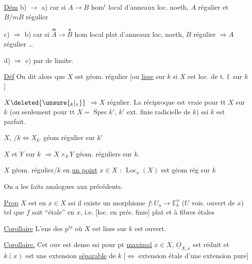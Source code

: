 \uline{Dém} b) $\to$ a) car si $A\to B$ hom$^{\mathrm t}$ local  d'anneaux loc. noeth, $A$ régulier et $B/mB$ régulier 

c) $\Rightarrow$ b) car si $\overset{\mathfrak m}{A}\to\overset{\mathfrak n}{B}$ hom local plat d'anneaux loc, noeth,  $B$ régulier $\Rightarrow A$ régulier \ldots

d) $\Rightarrow$ c) par  de limite.

\uline{Déf} On dit alors que $X$ est géom. régulier [ou \uline{lisse} sur $k$ si $X$ est loc. de t. f. sur $k$]

$X\deleted{\unsure{{}_k|{}_x}}$  $\Longrightarrow X$ régulier. La réciproque est vraie pour tt $X$ sur $k$ (ou seulement pour tt $X=\operatorname{Spec}k'$, $k'$ ext. finie radicielle de $k$) ssi $k$ est parfait.

$X$,  $/k\Longleftrightarrow X_{k'}$ géom régulier sur $k'$

$X$ et $Y$  sur $k$ $\Longrightarrow X\times_kY$ géom. réguliers sur $k$.

$X$  géom. régulier/$k$ en \uline{un point} $x\in X$ : $\operatorname{Loc}_x(X)$ est géom rég sur $k$ 

On a les faits analogues aux précédents.


\uline{Prop} $X$  est  en $x\in X$ ssi il existe un  morphisme $f:U_u\longrightarrow\mathbb E^n_k$ ($U$ vois. ouvert de $x$) tel que $f$ soit ``étale'' en $x$, i.e. [loc. en prés. finie] plat et à fibres étales

\uline{Corollaire} L'ens des p$^{\mathrm{ts}}$ où $X$ est  lisse sur $k$ est ouvert.


\uline{Corollaire.} Cet ouv est dense ssi pour  pt \uline{maximal} $x\in X$, $\underline O_{X,x}$ est réduit et $k(x)$ est une extension \uline{séparable} de $k$ $[\Leftrightarrow$  extension étale d'une extension  pure$]$


